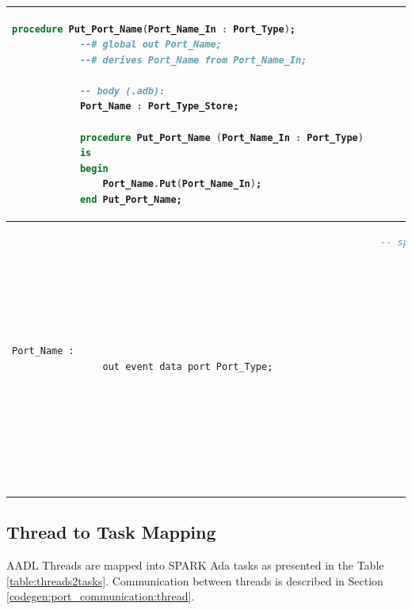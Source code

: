 \begin{center}
\begin{longtable}{| p{2in} | p{4in} |}
\begin{lstlisting}[language=ada]
			procedure Put_Port_Name(Port_Name_In : Port_Type);
			--# global out Port_Name;
			--# derives Port_Name from Port_Name_In;

			-- body (.adb):
			Port_Name : Port_Type_Store;

			procedure Put_Port_Name (Port_Name_In : Port_Type) 
			is
			begin
				Port_Name.Put(Port_Name_In);
			end Put_Port_Name;
		\end{lstlisting} 

		\\ \hline

		\begin{lstlisting}[language=aadl]
			Port_Name : 
				out event data port Port_Type;
		\end{lstlisting} 
		&
		\begin{lstlisting}[language=ada]
			-- spec (.ads)
			--# own protected Port_Name : Port_Type_Store(Priority => 10);
			
			procedure Send_Port_Name;
    		--# global in Port_Name;

			-- body (.adb):
			Port_Name : Port_Type_Store;

			procedure Send_Port_Name 
			is
			begin
				-- TODO: implement receiving Port_Name value
				-- e.g.:
				-- Some_Pkg.Put_Port_Name(Port_Name);
			end Send_Port_Name;
		\end{lstlisting} 
	\end{longtable}
\end{center}
\doublespacing


\subsection{Thread to Task Mapping}
\label{codegen:mapping:threads}

AADL Threads are mapped into SPARK Ada tasks as presented in the Table \ref{table:threads2tasks}. Communication between threads is described in Section \ref{codegen:port_communication:thread}.

